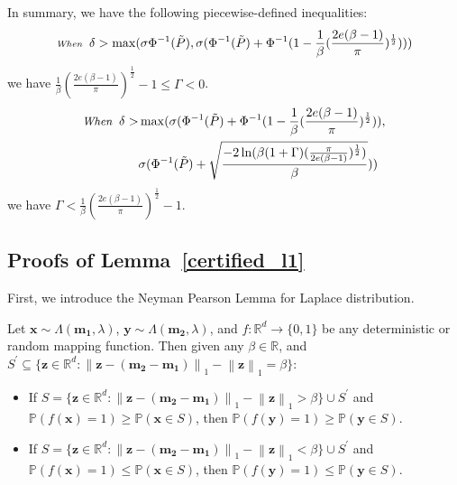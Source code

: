In summary, we have the following piecewise-defined inequalities:
\begin{equation}
\scriptsize
\textit{When}\;\;\delta >\max(\sigma\Phi^{-1}(\tilde{P}),\sigma(\Phi^{-1}(\tilde{P})+\Phi^{-1}(1-\frac{1}{\beta}(\frac{2e(\beta-1)}{\pi})^{\frac{1}{2}})))
\end{equation}
we have $\frac{1}{\beta}(\frac{2e(\beta-1)}{\pi})^{\frac{1}{2}}-1\leq\Gamma<0$.
\begin{align}
\begin{split}
\small
\textit{When}\;\; \delta>&\max(\sigma(\Phi^{-1}(\tilde{P})+\Phi^{-1}(1-\frac{1}{\beta}(\frac{2e(\beta-1)}{\pi})^{\frac{1}{2}})),\\
&\sigma(\Phi^{-1}(\tilde{P})+\sqrt{\frac{-2\ln(\beta(1+\Gamma)(\frac{\pi}{2e(\beta-1)})^{\frac{1}{2}})}{\beta}}))
\end{split}
\end{align}
we have $\Gamma<\frac{1}{\beta}(\frac{2e(\beta-1)}{\pi})^{\frac{1}{2}}-1$.

\subsection{Proofs of Lemma~\ref{certified_l1}}
First, we introduce the Neyman Pearson Lemma for Laplace distribution.
\begin{lemma}
Let $\mathbf{x}\sim\Lambda(\mathbf{m_1}, \lambda)$, $\mathbf{y}\sim\Lambda(\mathbf{m_2}, \lambda)$, and $f:\mathbb{R}^{d}\rightarrow\{0, 1\}$ be any deterministic or random mapping function. Then given any $\beta\in\mathbb{R}$, and $S^{\prime}\subseteq\{\mathbf{z}\in\mathbb{R}^{d}:\left\|\mathbf{z}-(\mathbf{m_2}-\mathbf{m_1})\right\|_1-\left\|\mathbf{z}\right\|_1=\beta\}$:
\begin{itemize}
\item If $S=\{\mathbf{z}\in\mathbb{R}^{d}: \left\|\mathbf{z}-(\mathbf{m_2}-\mathbf{m_1})\right\|_1-\left\|\mathbf{z}\right\|_1>\beta\}\cup S^{\prime}$ and $\mathbb{P}(f(\mathbf{x})=1)\geq\mathbb{P}(\mathbf{x}\in S)$, then $\mathbb{P}(f(\mathbf{y})=1)\geq\mathbb{P}(\mathbf{y}\in S)$.
\item If $S=\{\mathbf{z}\in\mathbb{R}^{d}: \left\|\mathbf{z}-(\mathbf{m_2}-\mathbf{m_1})\right\|_1-\left\|\mathbf{z}\right\|_1<\beta\}\cup S^{\prime}$ and $\mathbb{P}(f(\mathbf{x})=1)\leq\mathbb{P}(\mathbf{x}\in S)$, then $\mathbb{P}(f(\mathbf{y})=1)\leq\mathbb{P}(\mathbf{y}\in S)$.
\end{itemize}
\end{lemma}
